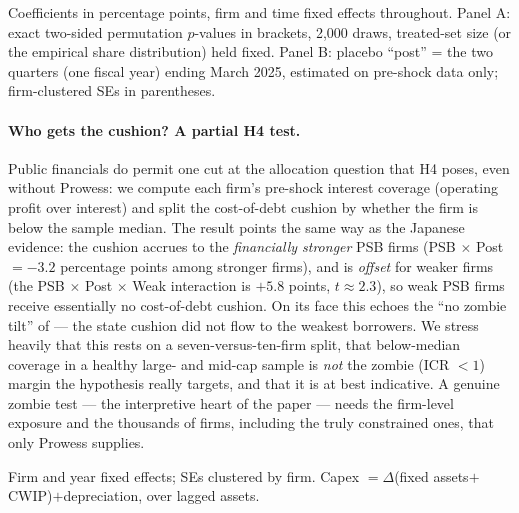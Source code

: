 \documentclass[12pt]{article}
\begin{document}
\begin{table}[t]
\centering
\begin{threeparttable}
\caption{Pilot inference: exact randomization tests and placebo shock dates}
\label{tab:p-inf}
\small

\begin{tablenotes}\footnotesize
\item Coefficients in percentage points, firm and time fixed effects throughout. Panel A:
exact two-sided permutation $p$-values in brackets, 2{,}000 draws, treated-set size (or the
empirical share distribution) held fixed. Panel B: placebo ``post'' = the two quarters (one
fiscal year) ending March 2025, estimated on pre-shock data only; firm-clustered SEs in
parentheses.
\end{tablenotes}
\end{threeparttable}
\end{table}

\paragraph{Who gets the cushion? A partial H4 test.} Public financials do permit one cut at
the allocation question that H4 poses, even without Prowess: we compute each firm's pre-shock
interest coverage (operating profit over interest) and split the cost-of-debt cushion by
whether the firm is below the sample median. The result points the same way as the Japanese
evidence: the cushion accrues to the \emph{financially stronger} PSB firms (PSB $\times$ Post
$=-3.2$ percentage points among stronger firms), and is \emph{offset} for weaker firms (the
PSB $\times$ Post $\times$ Weak interaction is $+5.8$ points, $t\approx2.3$), so weak PSB
firms receive essentially no cost-of-debt cushion. On its face this echoes the ``no zombie
tilt'' of \citet{lin2015government} --- the state cushion did not flow to the weakest
borrowers. We stress heavily that this rests on a seven-versus-ten-firm split, that
below-median coverage in a healthy large- and mid-cap sample is \emph{not} the zombie
(ICR $<1$) margin the hypothesis really targets, and that it is at best indicative. A genuine
zombie test --- the interpretive heart of the paper --- needs the firm-level exposure and the
thousands of firms, including the truly constrained ones, that only Prowess supplies.

\begin{table}[t]
\centering
\begin{threeparttable}
\caption{Pilot: state-bank attachment and capital expenditure}
\label{tab:p-capex}
\small

\begin{tablenotes}\footnotesize
\item Firm and year fixed effects; SEs clustered by firm. Capex $=\Delta$(fixed
assets$+$CWIP)$+$depreciation, over lagged assets.
\end{tablenotes}
\end{threeparttable}
\end{table}
\end{document}
